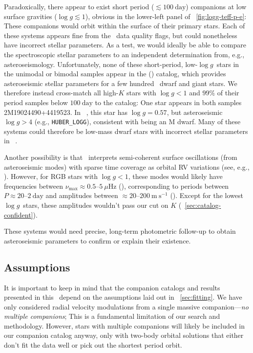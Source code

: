 \documentclass[modern, letterpaper]{aastex62}
\newcommand{\apogee}{\project{\acronym{APOGEE}}}
\newcommand{\thejoker}{\project{The~Joker}}
\newcommand{\DR}{\acronym{DR14}}
\newcommand{\logg}{\ensuremath{\log g}}
\begin{document}
Paradoxically, there appear to exist short period ($\lesssim 100~\textrm{day}$)
companions at low surface gravities ($\logg \lesssim 1$), obvious in the
lower-left panel of \figurename~\ref{fig:logg-teff-p-e}: These companions would
orbit within the surface of their primary stars.
Each of these systems appears fine from the \apogee\ data quality flags, but
could nonetheless have incorrect stellar parameters.
As a test, we would ideally be able to compare the spectroscopic stellar
parameters to an independent determination from, e.g., asteroseismology.
Unfortunately, none of these short-period, low-\logg\ stars in the unimodal or
bimodal samples appear in the  (\citealt{Serenelli:2017})
catalog, which provides asteroseismic stellar parameters for a few hundred
\apogee\ dwarf and giant stars.
We therefore instead cross-match all high-$K$ stars with $\logg < 1$ and $99\%$
of their period samples below $100~\textrm{day}$ to the 
catalog: One star appears in both samples 2M19024490+4419523.
In \apogee\ \DR, this star has $\logg = 0.57$, but asteroseismic $\logg > 4$
(e.g., \texttt{HUBER\_LOGG}), consistent with being an M dwarf.
Many of these systems could therefore be low-mass dwarf stars with incorrect
stellar parameters in \apogee\ \DR.

Another possibility is that \thejoker\ interprets semi-coherent surface
oscillations (from asteroseismic modes) with sparse time coverage as orbital RV
variations (see, e.g., \citealt{Hekker:2008}).
However, for RGB stars with $\logg < 1$, these modes would likely have
frequencies between $\nu_{\textrm{max}} \approx 0.5$--$5~\mu\textrm{Hz}$
(\citealt{Garcia:2018}), corresponding to periods between $P \approx
20$--$2~\textrm{day}$ and amplitudes between $\approx
20$--$200~\textrm{m}~\textrm{s}^{-1}$ (\citealt{Huber:2011,Huber:2017}).
Except for the lowest \logg\ stars, these amplitudes wouldn't pass our cut on
$K$ (\sectionname~\ref{sec:catalog-confident}).

These systems would need precise, long-term photometric follow-up to obtain
asteroseismic parameters to confirm or explain their existence.


\subsection{Assumptions}
\label{sec:discuss-assumptions}

It is important to keep in mind that the companion catalogs and results
presented in this \documentname\ depend on the assumptions laid out in
\sectionname~\ref{sec:fitting}.
We have only considered radial velocity modulations from a single massive
companion---\emph{no multiple companions}; This is a fundamental limitation of
our search and methodology.
However, stars with multiple companions will likely be included in our companion
catalog anyway, only with two-body orbital solutions that either don't fit the
data well or pick out the shortest period orbit.
\end{document}
